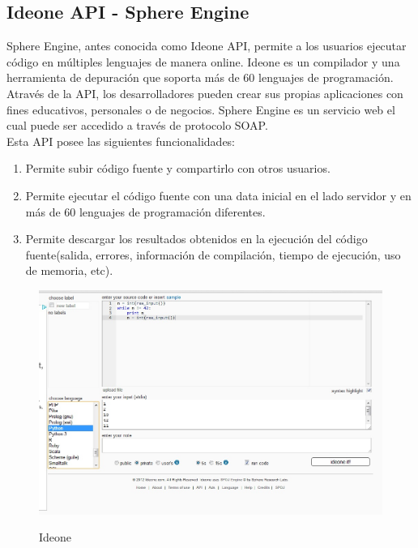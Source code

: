 \subsection{Ideone API - Sphere Engine}
Sphere Engine, antes conocida como Ideone API, permite a los usuarios ejecutar código en múltiples lenguajes de manera online. Ideone es un compilador y una herramienta de depuración que soporta más de 60 lenguajes de programación. Através de la API, los desarrolladores pueden crear sus propias aplicaciones con fines educativos, personales o de negocios. Sphere Engine es un servicio web el cual puede ser accedido a través de protocolo SOAP.\\

Esta API posee las siguientes funcionalidades:

\begin{enumerate}
  \item Permite subir código fuente y compartirlo con otros usuarios.
  \item Permite ejecutar el código fuente con una data inicial en el lado servidor y en más de 60 lenguajes de programación diferentes.
  \item Permite descargar los resultados obtenidos en la ejecución del código fuente(salida, errores, información de compilación, tiempo de ejecución, uso de memoria, etc).
\end{enumerate}
\begin{figure}[h]
  \centering
  \includegraphics[scale=0.5]{figuras/ideone.jpg}\\
  \caption[Ideone]{Ideone \protect\cite{ideone}}\label{fig:ideone}
\end{figure}


